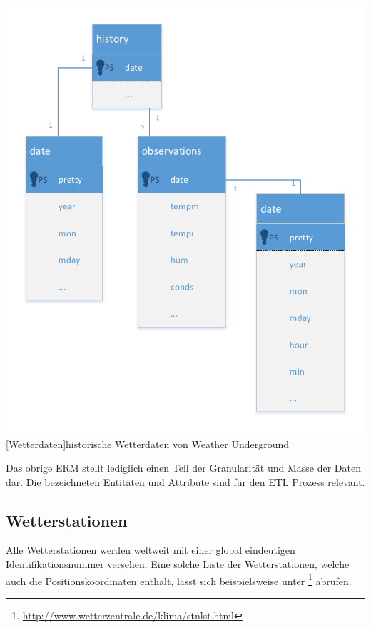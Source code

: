 \documentclass[a4paper,12pt]{scrartcl}
\makeatletter
\def\ScaleIfNeeded{%
\ifdim\Gin@nat@width>\linewidth
\linewidth
\else
\Gin@nat@width
\fi
}
\makeatother
\begin{document}
\begin{center}
\centering
\includegraphics[width=\ScaleIfNeeded]{../Weather.pdf}%
[Wetterdaten]{historische Wetterdaten von Weather Underground}%
\end{center}

Das obrige ERM stellt lediglich einen Teil der Granularität und Masse der Daten dar. Die bezeichneten Entitäten und Attribute sind für den ETL Prozess relevant.



\subsection{Wetterstationen}

Alle Wetterstationen werden weltweit mit einer global eindeutigen Identifikationsnummer versehen. Eine solche Liste der Wetterstationen, welche auch die Positionskoordinaten enth\"alt, l\"asst sich beispielsweise unter \footnote{\url{http://www.wetterzentrale.de/klima/stnlst.html}} abrufen.
\end{document}
